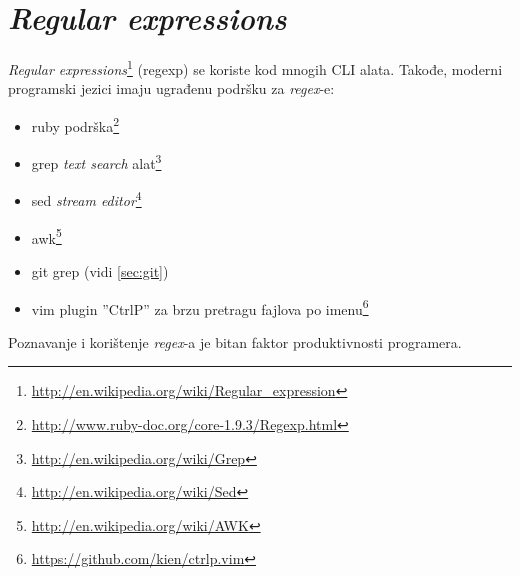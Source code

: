 \documentclass[times, utf8, seminar]{fit}
\begin{document}
\section{\emph{Regular expressions}}

\emph{Regular expressions}\footnote{\url{http://en.wikipedia.org/wiki/Regular_expression}} (regexp) se koriste kod mnogih CLI alata. Takođe, moderni programski jezici imaju ugrađenu podršku za \emph{regex}-e:
\begin{itemize}
   \item ruby podrška\footnote{\url{http://www.ruby-doc.org/core-1.9.3/Regexp.html}}
   \item grep \emph{text search} alat\footnote{\url{http://en.wikipedia.org/wiki/Grep}}
   \item sed \emph{stream editor}\footnote{\url{http://en.wikipedia.org/wiki/Sed}}
   \item awk\footnote{\url{http://en.wikipedia.org/wiki/AWK}}
   \item git grep (vidi \ref{sec:git})
   \item vim plugin ''CtrlP'' za brzu pretragu fajlova po imenu\footnote{\url{https://github.com/kien/ctrlp.vim}}
\end{itemize}

Poznavanje i korištenje \emph{regex}-a je bitan faktor produktivnosti programera.
 





\end{document}
